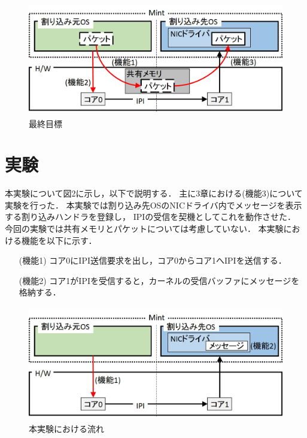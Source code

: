 \documentclass[12pt]{jsarticle}
\begin{document}
\begin{figure}[ht]
\begin{center}
\includegraphics[height=5.0cm]{./fig1.jpg}
\caption{最終目標}
\label{fig1}
\end{center}
\end{figure}

\section{実験}
本実験について図2に示し，以下で説明する．
主に3章における(機能3)について実験を行った．
本実験では割り込み先OSのNICドライバ内でメッセージを表示する割り込みハンドラを登録し，
IPIの受信を契機としてこれを動作させた．
今回の実験では共有メモリとパケットについては考慮していない．
本実験における機能を以下に示す．
\begin{itemize}
\item[(機能1)] コア0にIPI送信要求を出し，コア0からコア1へIPIを送信する．
\item[(機能2)] コア1がIPIを受信すると，カーネルの受信バッファにメッセージを格納する．
\end{itemize}






\begin{figure}[t]
\begin{center}
\includegraphics[height=5.0cm]{./fig2.jpg}
\caption{本実験における流れ}
\label{fig2}
\end{center}
\end{figure}
\end{document}
